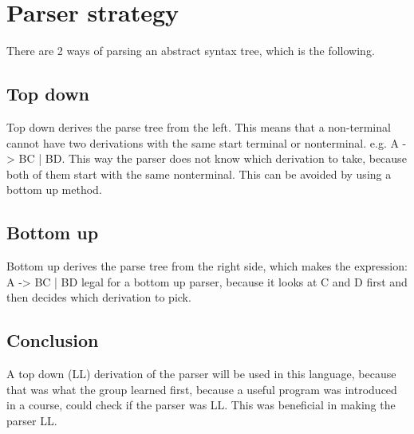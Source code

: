 \section{Parser strategy}
\label{Parserstrategy}
There are 2 ways of parsing an abstract syntax tree, which is the following.
\subsection*{Top down}
Top down derives the parse tree from the left. This means that a non-terminal cannot have two derivations with the same start terminal or nonterminal. e.g. A -> BC | BD. This way the parser does not know which derivation to take, because both of them start with the same nonterminal.
This can be avoided by using a bottom up method.


\subsection*{Bottom up}
Bottom up derives the parse tree from the right side, which makes the expression: A -> BC | BD legal for a bottom up parser, because it looks at C and D first and then decides which derivation to pick.


\subsection*{Conclusion}
A top down (LL) derivation of the parser will be used in this language, because that was what the group learned first, because a useful program was introduced in a course, could check if the parser was LL. This was beneficial in making the parser LL.
